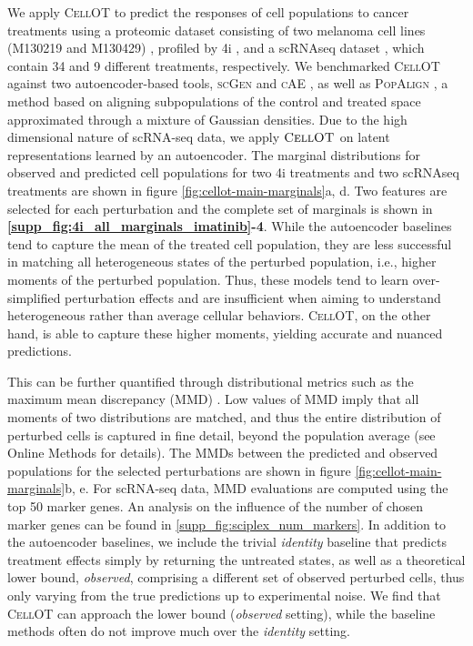 We apply \textsc{CellOT} to predict the responses of cell populations to cancer treatments using a proteomic dataset consisting of two melanoma cell lines (M130219 and M130429) \cite{raaijmakers2015new}, profiled by 4i \cite{gut2018multiplexed}, and a scRNAseq dataset \cite{srivatsan2020massively}, which contain 34 and 9 different treatments, respectively.
We benchmarked \textsc{CellOT} against two autoencoder-based tools, \textsc{scGen} \cite{lotfollahi2019scgen} and \textsc{cAE} \cite{Lopez2018scvi}, as well as \textsc{PopAlign} \cite{chen2020dissecting}, a method based on aligning subpopulations of the control and treated space approximated through a mixture of Gaussian densities.
Due to the high dimensional nature of scRNA-seq data, we apply $\textsc{CellOT}$ on latent representations learned by an autoencoder.
The marginal distributions for observed and predicted cell populations for two 4i treatments and two scRNAseq treatments are shown in figure \ref{fig:cellot-main-marginals}a, d.
Two features are selected for each perturbation and the complete set of marginals is shown in \textbf{\ref{supp_fig:4i_all_marginals_imatinib}-4}.
While the autoencoder baselines tend to capture the mean of the treated cell population, they are less successful in matching all heterogeneous states of the perturbed population, i.e., higher moments of the perturbed population.
Thus, these models tend to learn over-simplified perturbation effects and are insufficient when aiming to understand heterogeneous rather than average cellular behaviors.
\textsc{CellOT}, on the other hand, is able to capture these higher moments, yielding accurate and nuanced predictions.

This can be further quantified %
through distributional metrics such as the maximum mean discrepancy (MMD) \cite{gretton2012kernel}.
Low values of MMD imply that all moments of two distributions are matched, and thus the entire distribution of perturbed cells is captured in fine detail, beyond the population average (see Online Methods for details).
The MMDs between the predicted and observed populations for the selected perturbations are shown in figure \ref{fig:cellot-main-marginals}b, e.
For scRNA-seq data, MMD evaluations are computed using the top 50 marker genes. An analysis on the influence of the number of chosen marker genes can be found in \ref{supp_fig:sciplex_num_markers}.
In addition to the autoencoder baselines, we include the trivial \emph{identity} baseline that predicts treatment effects simply by returning the untreated states,
as well as a theoretical lower bound, \emph{observed}, comprising a different set of observed perturbed cells, thus only varying from the true predictions up to experimental noise.
We find that \textsc{CellOT} can approach the lower bound (\emph{observed} setting), while the baseline methods often do not improve much over the \emph{identity} setting.

